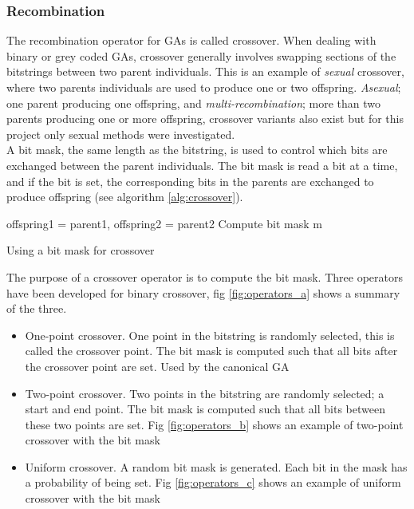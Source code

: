 \subsubsection{Recombination}
The recombination operator for GAs is called crossover. When dealing with binary or grey coded GAs, crossover generally involves swapping sections of the bitstrings between two parent individuals. This is an example of \emph{sexual} crossover, where two parents individuals are used to produce one or two offspring.\emph{ Asexual}; one parent producing one offspring, and \emph{multi-recombination}; more than two parents producing one or more offspring, crossover variants also exist but for this project only sexual methods were investigated.
\\A bit mask, the same length as the bitstring, is used to control which bits are exchanged between the parent individuals. The bit mask is read a bit at a time, and if the bit is set, the corresponding bits in the parents are exchanged to produce offspring (see algorithm \ref{alg:crossover}\cite{4-ga}).
\begin{algorithm}[tp]
\label{alg:crossover}
  \SetAlgoLined
  offspring1 = parent1, offspring2 = parent2\;
  Compute bit mask m\;
\caption{Using a bit mask for crossover}
\end{algorithm}
The purpose of a crossover operator is to compute the bit mask. Three operators have been developed for binary crossover, fig \ref{fig:operators_a}\cite{gacross} shows a summary of the three.
\begin{itemize}
  \item{One-point crossover. One point in the bitstring is randomly selected, this is called the crossover point. The bit mask is computed such that all bits after the crossover point are set. Used by the canonical GA}
  \item{Two-point crossover. Two points in the bitstring are randomly selected; a start and end point. The bit mask is computed such that all bits between these two points are set. Fig \ref{fig:operators_b}\cite{l2} shows an example of two-point crossover with the bit mask}
  \item{Uniform crossover. A random bit mask is generated. Each bit in the mask has a probability of being set. Fig \ref{fig:operators_c}\cite{l2} shows an example of uniform crossover with the bit mask}
\end{itemize}
